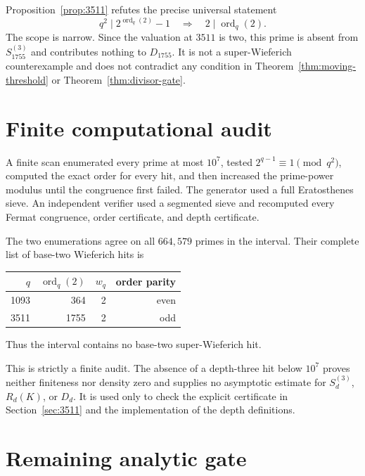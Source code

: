 \documentclass[11pt]{article}
\theoremstyle{remark}
\DeclareMathOperator{\ord}{ord}
\begin{document}
Proposition~\ref{prop:3511} refutes the precise universal statement
\begin{equation}
 q^2\mid2^{\ord_q(2)}-1
 \quad\Longrightarrow\quad
 2\mid\ord_q(2).
 \label{eq:false-parity-claim}
\end{equation}
The scope is narrow.  Since the valuation at $3511$ is two, this prime is
absent from $S_{1755}^{(3)}$ and contributes nothing to $D_{1755}$.  It is
not a super-Wieferich counterexample and does not contradict any condition
in Theorem~\ref{thm:moving-threshold} or
Theorem~\ref{thm:divisor-gate}.

\section{Finite computational audit}
\label{sec:scan}

A finite scan enumerated every prime at most $10^7$, tested
$2^{q-1}\equiv1\pmod{q^2}$, computed the exact order for every hit, and
then increased the prime-power modulus until the congruence first failed.
The generator used a full Eratosthenes sieve.  An independent verifier used
a segmented sieve and recomputed every Fermat congruence, order certificate,
and depth certificate.

The two enumerations agree on all $664{,}579$ primes in the interval.  Their
complete list of base-two Wieferich hits is
\begin{center}
\begin{tabular}{@{}rrrr@{}}
\toprule
$q$ & $\ord_q(2)$ & $w_q$ & order parity\\
\midrule
1093 & 364  & 2 & even\\
3511 & 1755 & 2 & odd\\
\bottomrule
\end{tabular}
\end{center}
Thus the interval contains no base-two super-Wieferich hit.

This is strictly a finite audit.  The absence of a depth-three hit below
$10^7$ proves neither finiteness nor density zero and supplies no
asymptotic estimate for $S_d^{(3)}$, $R_d(K)$, or $D_d$.  It is used only
to check the explicit certificate in Section~\ref{sec:3511} and the
implementation of the depth definitions.

\section{Remaining analytic gate}
\label{sec:open}
\end{document}
